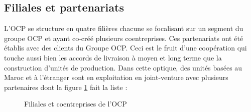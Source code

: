 	\subsection{Filiales et partenariats}
	L'OCP se structure en quatre filières chacune se focalisant sur un segment du groupe OCP et ayant co-créé plusieurs coentreprises. Ces partenariats ont été établis avec des clients du Groupe OCP. Ceci est le fruit d’une coopération qui touche aussi bien les accords de livraison à moyen et long terme que la
	construction d'unités de production. Dans cette optique, des unités basées au Maroc et à
	l'étranger sont en exploitation en joint-venture avec plusieurs partenaires dont la figure \ref{fig:mesh1} fait la liste : 
	\begin{figure}[h]
    		\centering
    		\caption{Filiales et coentreprises de l’OCP \cite{ocp-fil}}
    		\label{fig:mesh1}
	\end{figure}
